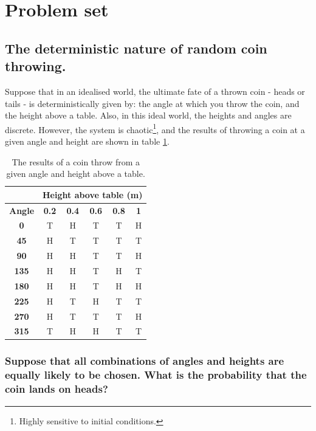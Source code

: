 \documentclass[11pt,fullpage]{book}
\begin{document}
\section{Problem set}
\subsection{The deterministic nature of random coin throwing.}
Suppose that in an idealised world, the ultimate fate of a thrown coin - heads or tails - is deterministically given by: the angle at which you throw the coin, and the height above a table. Also, in this ideal world, the heights and angles are discrete. However, the system is chaotic\footnote{Highly sensitive to initial conditions.}, and the results of throwing a coin at a given angle and height are shown in table \ref{tab:Intro_PS_coinThrowsDeterministic}. 

\begin{table}[htbp]
  \centering
    \begin{tabular}{rccccc}
    \toprule
          & \multicolumn{5}{c}{\textbf{Height above table (m)}} \\
    \midrule
    \multicolumn{1}{c}{\textbf{Angle}} & \textbf{0.2} & \textbf{0.4} & \textbf{0.6} & \textbf{0.8} & \textbf{1} \\
    \multicolumn{1}{c}{\textbf{0}} & T     & H     & T     & T     & H \\
    \multicolumn{1}{c}{\textbf{45}} & H     & T     & T     & T     & T \\
    \multicolumn{1}{c}{\textbf{90}} & H     & H     & T     & T     & H \\
    \multicolumn{1}{c}{\textbf{135}} & H     & H     & T     & H     & T \\
    \multicolumn{1}{c}{\textbf{180}} & H     & H     & T     & H     & H \\
    \multicolumn{1}{c}{\textbf{225}} & H     & T     & H     & T     & T \\
    \multicolumn{1}{c}{\textbf{270}} & H     & T     & T     & T     & H \\
    \multicolumn{1}{c}{\textbf{315}} & T     & H     & H     & T     & T \\
    \bottomrule
    \end{tabular}%
  \caption{The results of a coin throw from a given angle and height above a table.}\label{tab:Intro_PS_coinThrowsDeterministic}%
\end{table}%

\subsubsection{Suppose that all combinations of angles and heights are equally likely to be chosen. What is the probability that the coin lands on heads?}
\end{document}
